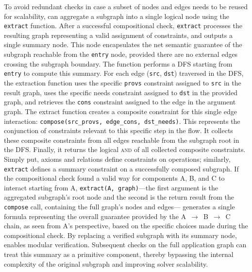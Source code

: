 To avoid redundant checks in case a subset of nodes and edges needs to be reused for scalability,
\sysname{} can aggregate a subgraph into a single logical node using the \texttt{extract} function.
After a successful compositional check, \texttt{extract} processes the resulting graph
representing a valid assignment of constraints, and outputs a single summary node.
This node encapsulates the net semantic guarantee of the subgraph reachable from the 
\texttt{entry} node, provided there are no external edges crossing the subgraph boundary.
The function performs a DFS starting from \texttt{entry} to compute this summary.
For each edge (\texttt{src}, \texttt{dst})
traversed in the DFS, the extraction function uses the specific \texttt{provs}
constraint assigned to \texttt{src} in the result graph, uses the specific
needs constraint assigned to \texttt{dst} in the provided graph, and retrieves
the \texttt{cons} constraint assigned to the edge in
the argument graph. The extract function creates a composite constraint
for this single edge interaction: \texttt{compose(src\_provs, edge\_cons,
dst\_needs)}. This represents the conjunction of constraints relevant
to this specific step in the flow. It collects these composite
constraints from all edges reachable from the subgraph root in the DFS. Finally,
it returns the logical \textsc{and} of all collected composite
constraints. Simply put, axioms and relations define constraints on
operations; similarly, \texttt{extract} defines a summary constraint on a
successfully composed subgraph. If the compositional check found a valid
way for components A, B, and C to interact starting from A,
\texttt{extract(A, graph)}---the first argument is the aggregated subgraph's root node and the second is the return result from
the \texttt{compose} call, containing the full graph's nodes and edges---%
generates a single formula representing the
overall guarantee provided by the A $\,\to\,$ B $\,\to\,$ C chain, as seen from A's
perspective, based on the specific choices made during the compositional check.
By replacing a verified subgraph with its summary node, \sysname{} enables modular verification.
Subsequent checks on the full application graph can treat this summary as a primitive component,
thereby bypassing the internal complexity of the original subgraph and improving solver scalability.

